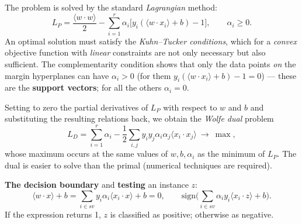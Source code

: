 \documentclass[11pt,a4paper]{article}
\theoremstyle{definition}
\begin{document}
\begin{defbox}
The problem is solved by the standard \emph{Lagrangian} method:
\[ L_P=\frac{\langle w\cdot w\rangle}{2}-\sum_{i=1}^{r}\alpha_i
   \big[y_i(\langle w\cdot x_i\rangle+b)-1\big],\qquad \alpha_i\ge 0. \]
An optimal solution must satisfy the \emph{Kuhn--Tucker conditions}, which for a \emph{convex}
objective function with \emph{linear} constraints are not only necessary but also sufficient. The
complementarity condition shows that only the data points \emph{on} the margin hyperplanes can
have $\alpha_i>0$ (for them $y_i(\langle w\cdot x_i\rangle+b)-1=0$) --- these are the
\textbf{support vectors}; for all the others $\alpha_i=0$.

Setting to zero the partial derivatives of $L_P$ with respect to $w$ and $b$ and substituting the
resulting relations back, we obtain the \emph{Wolfe dual} problem
\[ L_D=\sum_{i=1}^{r}\alpha_i-\frac12\sum_{i,j}y_iy_j\alpha_i\alpha_j
   \langle x_i\cdot x_j\rangle\ \longrightarrow\ \max, \]
whose maximum occurs at the same values of $w,b,\alpha_i$ as the minimum of $L_P$. The dual is
easier to solve than the primal (numerical techniques are required).

\textbf{The decision boundary} and \textbf{testing} an instance $z$:
\[ \langle w\cdot x\rangle+b=\sum_{i\in \mathit{sv}}y_i\alpha_i\langle x_i\cdot x\rangle+b=0,
\qquad
\mathrm{sign}\Big(\sum_{i\in \mathit{sv}}\alpha_iy_i\langle x_i\cdot z\rangle+b\Big). \]
If the expression returns 1, $z$ is classified as positive; otherwise as negative.
\end{defbox}
\end{document}

